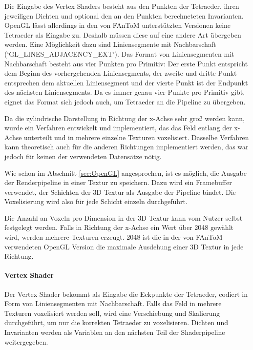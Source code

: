 \documentclass[a4paper,fontsize=12pt,toc=bib,halfparskip]{scrartcl}
\begin{document}
Die Eingabe des Vertex Shaders besteht aus den Punkten der Tetraeder, ihren jeweiligen Dichten und optional den an den Punkten berechneteten Invarianten. OpenGL l\"asst allerdings in den von FAnToM unterst\"utzten Versionen keine Tetraeder als Eingabe zu. Deshalb m\"ussen diese auf eine andere Art \"ubergeben werden. Eine M\"oglichkeit dazu sind Liniensegmente mit Nachbarschaft (`GL\_LINES\_ADJACENCY\_EXT'). Das Format von Liniensegmenten mit Nachbarschaft besteht aus vier Punkten pro Primitiv: Der erste Punkt entspricht dem Beginn des vorhergehenden Liniensegments, der zweite und dritte Punkt entsprechen dem aktuellen Liniensegment und der vierte Punkt ist der Endpunkt des n\"achsten Liniensegments. Da es immer genau vier Punkte pro Primitiv gibt, eignet das Format sich jedoch auch, um Tetraeder an die Pipeline zu \"ubergeben.

Da die zylindrische Darstellung in Richtung der x-Achse sehr gro{\ss} werden kann, wurde ein Verfahren entwickelt und implementiert, das das Feld entlang der x-Achse unterteilt und in mehrere einzelne Texturen voxelisiert. Dasselbe Verfahren kann theoretisch auch f\"ur die anderen Richtungen implementiert werden, das war jedoch f\"ur keinen der verwendeten Datens\"atze n\"otig.

Wie schon im Abschnitt \ref{sec:OpenGL} angesprochen, ist es m\"oglich, die Ausgabe der Renderpipeline in einer Textur zu speichern. Dazu wird ein Framebuffer verwendet, der Schichten der 3D Textur als Ausgabe der Pipeline bindet. Die Voxelisierung wird also f\"ur jede Schicht einzeln durchgef\"uhrt.

Die Anzahl an Voxeln pro Dimension in der 3D Textur kann vom Nutzer selbst festgelegt werden. Falls in Richtung der x-Achse ein Wert \"uber 2048 gew\"ahlt wird, werden mehrere Texturen erzeugt. 2048 ist die in der von FAnToM verwendeten OpenGL Version die maximale Ausdehung einer 3D Textur in jede Richtung.

\paragraph{Vertex Shader}
Der Vertex Shader bekommt als Eingabe die Eckpunkte der Tetraeder, codiert in Form von Liniensegmenten mit Nachbarschaft. Falls das Feld in mehrere Texturen voxelisiert werden soll, wird eine Verschiebung und Skalierung durchgef\"uhrt, um nur die korrekten Tetraeder zu voxelisieren. Dichten und Invarianten werden als Variablen an den n\"achsten Teil der Shaderpipeline weitergegeben.
\end{document}
